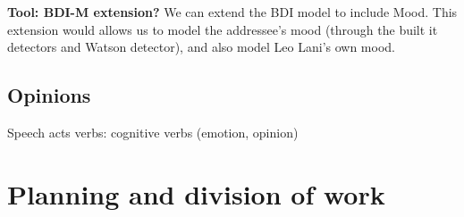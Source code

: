 \documentclass[a4paper]{article}
\begin{document}
\textbf{Tool: BDI-M extension?}
We can extend the BDI model to include Mood. This extension would allows us to model the addressee's mood (through the built it detectors and Watson detector), and also model Leo Lani's own mood. 

\subsection{Opinions}
Speech acts verbs: cognitive verbs (emotion, opinion)



\newpage

\section{Planning and division of work}
\end{document}
